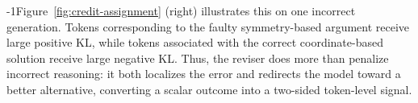\looseness-1Figure~\ref{fig:credit-assignment} (right) illustrates this on one incorrect generation. Tokens corresponding to the faulty symmetry-based argument receive large positive KL, while tokens associated with the correct coordinate-based solution receive large negative KL. Thus, the reviser does more than penalize incorrect reasoning: it both localizes the error and redirects the model toward a better alternative, converting a scalar outcome into a two-sided token-level signal.






